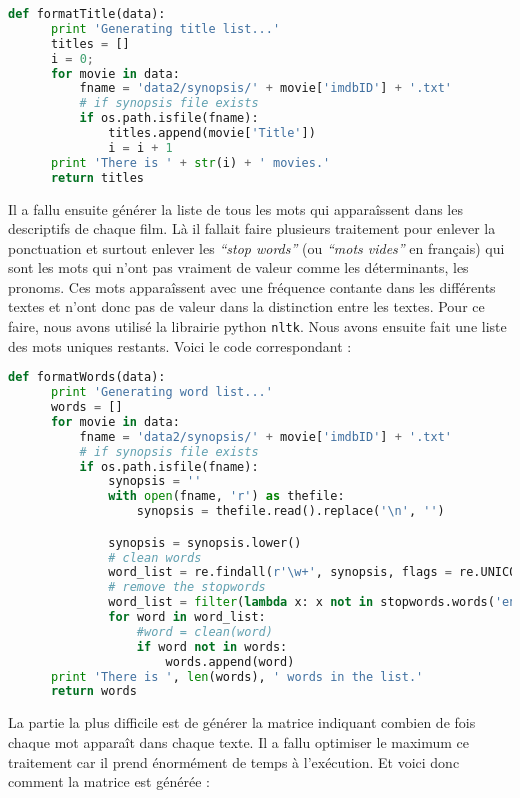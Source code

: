 \begin{lstlisting}[language=python]
  def formatTitle(data):
      print 'Generating title list...'
      titles = []
      i = 0;
      for movie in data:
          fname = 'data2/synopsis/' + movie['imdbID'] + '.txt'
          # if synopsis file exists
          if os.path.isfile(fname):
              titles.append(movie['Title'])
              i = i + 1
      print 'There is ' + str(i) + ' movies.'
      return titles
\end{lstlisting}

Il a fallu ensuite générer la liste de tous les mots qui apparaîssent dans les descriptifs de chaque film. Là il fallait faire plusieurs traitement pour enlever la ponctuation et surtout enlever les \textit{``stop words''} (ou \textit{``mots vides''} en français) qui sont les mots qui n'ont pas vraiment de valeur comme les déterminants, les pronoms. Ces mots apparaîssent avec une fréquence contante dans les différents textes et n'ont donc pas de valeur dans la distinction entre les textes. Pour ce faire, nous avons utilisé la librairie python \texttt{nltk}. Nous avons ensuite fait une liste des mots uniques restants. Voici le code correspondant : \\

\begin{lstlisting}[language=python]
  def formatWords(data):
      print 'Generating word list...'
      words = []
      for movie in data:
          fname = 'data2/synopsis/' + movie['imdbID'] + '.txt'
          # if synopsis file exists
          if os.path.isfile(fname):
              synopsis = ''
              with open(fname, 'r') as thefile:
                  synopsis = thefile.read().replace('\n', '')

              synopsis = synopsis.lower()
              # clean words
              word_list = re.findall(r'\w+', synopsis, flags = re.UNICODE | re.LOCALE) 
              # remove the stopwords
              word_list = filter(lambda x: x not in stopwords.words('english'), word_list)
              for word in word_list:
                  #word = clean(word)
                  if word not in words:
                      words.append(word)
      print 'There is ', len(words), ' words in the list.'
      return words
\end{lstlisting}

La partie la plus difficile est de générer la matrice indiquant combien de fois chaque mot apparaît dans chaque texte. Il a fallu optimiser le maximum ce traitement car il prend énormément de temps à l'exécution. Et voici donc comment la matrice est générée : \\

